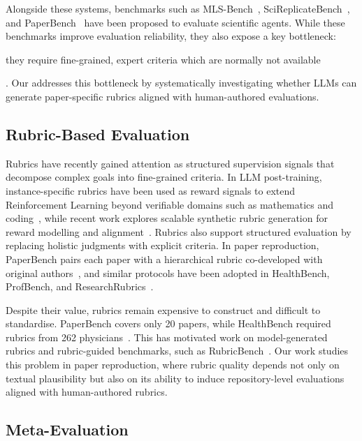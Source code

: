\documentclass[11pt]{article}
\newif\ifreview
\newcommand{\hh}[1]{%
\ifreview
{\textcolor{orange!90!black}{#1}}
\else
#1
\fi
}
\begin{document}
Alongside these systems, benchmarks such as MLS-Bench~\cite{lyu2026mlsbenchholisticrigorousassessment}, SciReplicateBench~\cite{xiang2025scireplicatebench}, and PaperBench~\cite{starace2025paperbenchevaluatingaisability} have been proposed to evaluate scientific agents. While these benchmarks improve evaluation reliability, they also expose a key bottleneck: \hh{they require fine-grained, expert criteria which are normally not available}. Our addresses this bottleneck by systematically investigating whether LLMs can generate paper-specific rubrics aligned with human-authored evaluations.

\subsection{Rubric-Based Evaluation}

Rubrics have recently gained attention as structured supervision signals that decompose complex goals into fine-grained criteria. In LLM post-training, instance-specific rubrics have been used as reward signals to extend Reinforcement Learning beyond verifiable domains such as mathematics and coding~\cite{gunjal2026rubrics}, while recent work explores scalable synthetic rubric generation for reward modelling and alignment~\cite{liu2026openrubricsscalablesyntheticrubric}. Rubrics also support structured evaluation by replacing holistic judgments with explicit criteria. In paper reproduction, PaperBench pairs each paper with a hierarchical rubric co-developed with original authors~\cite{starace2025paperbenchevaluatingaisability}, and similar protocols have been adopted in HealthBench, ProfBench, and ResearchRubrics~\cite{arora2025healthbenchevaluatinglargelanguage,wang2025profbenchmultidomainrubricsrequiring,sharma2025researchrubricsbenchmarkpromptsrubrics}.

Despite their value, rubrics remain expensive to construct and difficult to standardise. PaperBench covers only 20 papers, while HealthBench required rubrics from 262 physicians~\cite{starace2025paperbenchevaluatingaisability,arora2025healthbenchevaluatinglargelanguage}. This has motivated work on model-generated rubrics and rubric-guided benchmarks, such as RubricBench~\cite{zhou-etal-2026-rubricbench}. Our work studies this problem in paper reproduction, where rubric quality depends not only on textual plausibility but also on its ability to induce repository-level evaluations aligned with human-authored rubrics.

\subsection{Meta-Evaluation}
\end{document}
